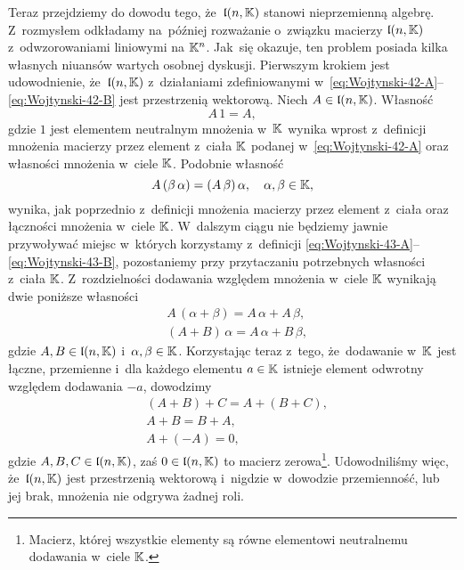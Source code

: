 \documentclass[a4paper,11pt]{article}
\numberwithin{equation}{section}
\begin{document}
Teraz przejdziemy do dowodu tego, że~$\mathfrak{l}( n, \mathbb{K} )$ stanowi
nieprzemienną algebrę. Z~rozmysłem odkładamy na~później rozważanie
o~związku macierzy $\mathfrak{l}( n, \mathbb{K} )$ z~odwzorowaniami liniowymi na
$\mathbb{K}^{ n }$. Jak~się okazuje, ten problem posiada kilka własnych niuansów
wartych osobnej dyskusji. Pierwszym krokiem jest udowodnienie,
że~$\mathfrak{l}( n, \mathbb{K} )$ z~działaniami zdefiniowanymi
w~\eqref{eq:Wojtynski-42-A}--\eqref{eq:Wojtynski-42-B} jest przestrzenią
wektorową. Niech $A \in \mathfrak{l}( n, \mathbb{K} )$. Własność
\begin{equation}
  \label{eq:Wojtynski-46}
  A \, 1 = A,
\end{equation}
gdzie $1$ jest elementem neutralnym mnożenia w~$\mathbb{K}$ wynika wprost
z~definicji mnożenia macierzy przez element z~ciała $\mathbb{K}$ podanej
w~\eqref{eq:Wojtynski-42-A} oraz własności mnożenia w~ciele $\mathbb{K}$.
Podobnie własność
\begin{equation}
  \label{eq:Wojtynski-47}
  A \, ( \beta \, \alpha ) = ( A \, \beta ) \, \alpha, \quad \alpha, \beta \in \mathbb{K},
\end{equation}
wynika, jak poprzednio z~definicji mnożenia macierzy przez element z~ciała
oraz łączności mnożenia w~ciele $\mathbb{K}$. W~dalszym ciągu nie będziemy jawnie
przywoływać miejsc w~których korzystamy z~definicji
\eqref{eq:Wojtynski-43-A}--\eqref{eq:Wojtynski-43-B}, pozostaniemy przy
przytaczaniu potrzebnych własności z~ciała $\mathbb{K}$. Z~rozdzielności dodawania
względem mnożenia w~ciele $\mathbb{K}$ wynikają dwie poniższe własności
\begin{subequations}
  \begin{align}
    \label{eq:Wojtynski-48-A}
    &A \, ( \alpha + \beta ) = A \, \alpha + A \, \beta, \\
    \label{eq:Wojtynski-48-B}
    &( A + B ) \, \alpha = A \, \alpha + B \, \beta,
  \end{align}
\end{subequations}
gdzie $A, B \in \mathfrak{l}( n, \mathbb{K} )$ i~$\alpha, \beta \in \mathbb{K}$. Korzystając teraz
z~tego, że~dodawanie w~$\mathbb{K}$ jest łączne, przemienne i~dla każdego
elementu $a \in \mathbb{K}$ istnieje element odwrotny względem dodawania $-a$,
dowodzimy
\begin{subequations}
  \begin{align}
    \label{eq:Wojtynski-49-A}
    &( A + B ) + C = A + ( B + C ), \\
    \label{eq:Wojtynski-49-B}
    &A + B = B + A, \\
    \label{eq:Wojtynski-49-C}
    &A + ( -A ) = 0,
  \end{align}
\end{subequations}
gdzie $A, B, C \in \mathfrak{l}( n, \mathbb{K} )$, zaś $0 \in \mathfrak{l}( n, \mathbb{K} )$ to
macierz zerowa\footnote{Macierz, której wszystkie elementy są równe
  elementowi neutralnemu dodawania w~ciele $\mathbb{K}$.}. Udowodniliśmy więc,
że~$\mathfrak{l}( n, \mathbb{K} )$ jest przestrzenią wektorową i~nigdzie w~dowodzie
przemienność, lub jej brak, mnożenia nie odgrywa żadnej roli.
\end{document}
